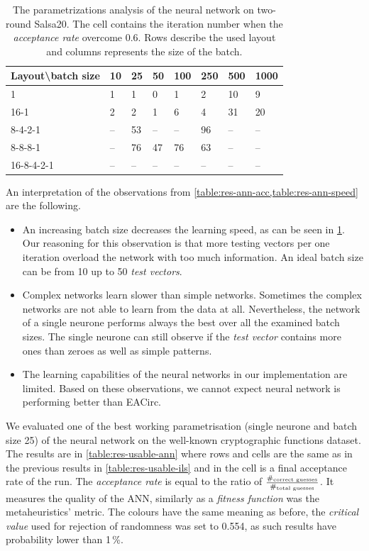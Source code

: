 \documentclass[
    digital,    %
    oneside,    %
    color,
    11pt,
    nocover,
    notable,
    nolof,
    nolot,
]{fithesis3}
\begin{document}
\begin{table}[t]
\centering
\begin{tabular}{l|l l l l l l l}
\textbf{\large Layout\textbackslash{}batch size} & \textbf{\large 10} & \textbf{\large 25} & \textbf{\large 50} & \textbf{\large 100} & \textbf{\large 250} & \textbf{\large 500} & \textbf{\large 1000}\\ \hline
1          & 1 & 1 & 0 & 1 & 2 & 10 & 9 \\
16-1       & 2 & 2 & 1 & 6 & 4 & 31 & 20 \\
8-4-2-1    & -- & 53 & -- & -- & 96 & -- & -- \\ 
8-8-8-1    & -- & 76 & 47 & 76 & 63 & -- & -- \\
16-8-4-2-1 & -- & -- & -- & -- & -- & -- & --  

\end{tabular}
\caption{The parametrizations analysis of the neural network on two-round Salsa20. The cell contains the iteration number when the \textit{acceptance rate} overcome 0.6. Rows describe the used layout and columns represents the size of the batch.}
\label{table:res-ann-speed}
\end{table}

An interpretation of the observations from \cref{table:res-ann-acc,table:res-ann-speed} are the following.

\begin{itemize}
    \item An increasing batch size decreases the learning speed, as can be seen in \cref{table:res-ann-speed}. Our reasoning for this observation is that more testing vectors per one iteration overload the network with too much information. An ideal batch size can be from 10 up to 50 \textit{test vectors}.
    \item Complex networks learn slower than simple networks. Sometimes the complex networks are not able to learn from the data at all. Nevertheless, the network of a single neurone performs always the best over all the examined batch sizes. The single neurone can still observe if the \textit{test vector} contains more ones than zeroes as well as simple patterns.
    \item The learning capabilities of the neural networks in our implementation are limited. Based on these observations, we cannot expect neural network is performing better than EACirc.
\end{itemize}

We evaluated one of the best working parametrisation (single neurone and batch size 25) of the neural network on the well-known cryptographic functions dataset. The results are in \cref{table:res-usable-ann} where rows and cells are the same as in the previous results in \cref{table:res-usable-ils} and in the cell is a final acceptance rate of the run. The \textit{acceptance rate} is equal to the ratio of $\frac{\#_{\textnormal{correct guesses}}}{\#_{\textnormal{total guesses}}}$. It measures the quality of the ANN, similarly as a \textit{fitness function} was the metaheuristics' metric. The colours have the same meaning as before, the \textit{critical value} used for rejection of randomness was set to 0.554, as such results have probability lower than 1\,\%.
\end{document}
